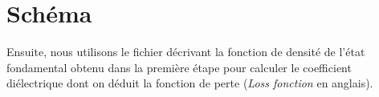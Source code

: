 \section{Schéma}

Ensuite, nous utilisons le fichier décrivant la fonction de densité de l'état fondamental
obtenu dans la première étape pour calculer le coefficient diélectrique
dont on déduit la fonction de perte (\textit{Loss fonction} en anglais).

